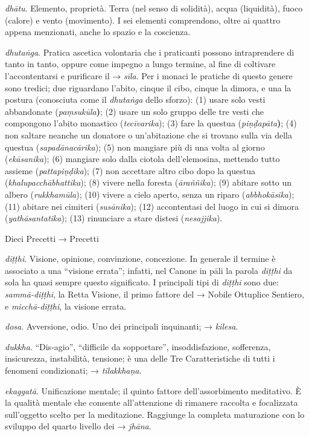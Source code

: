 \emph{dhātu}. Elemento, proprietà. Terra (nel senso di solidità), acqua
(liquidità), fuoco (calore) e vento (movimento). I sei elementi
comprendono, oltre ai quattro appena menzionati, anche lo spazio e la
coscienza.

\emph{dhutaṅga}. Pratica ascetica volontaria che i praticanti possono
intraprendere di tanto in tanto, oppure come impegno a lungo termine, al
fine di coltivare l'accontentarsi e purificare il → \emph{sīla}. Per i
monaci le pratiche di questo genere sono tredici; due riguardano
l'abito, cinque il cibo, cinque la dimora, e una la postura (conosciuta
come il \emph{dhutaṅga} dello sforzo): (1) usare solo vesti abbandonate
(\emph{paṃsukūla}\textbf{)}; (2) usare un solo gruppo delle tre vesti
che compongono l'abito monastico (\emph{tecīvarika}); (3) fare la
questua (\emph{piṇḍapāta}\textbf{)}; (4) non saltare neanche un donatore
o un'abitazione che si trovano sulla via della questua
(\emph{sapadānacārika}); (5) non mangiare più di una volta al giorno
(\emph{ekāsanika}); (6) mangiare solo dalla ciotola dell'elemosina,
mettendo tutto assieme (\emph{pattapiṇḍika}); (7) non accettare altro
cibo dopo la questua (\emph{khalupacchābhattika}); (8) vivere nella
foresta (\emph{āraññika}); (9) abitare sotto un albero
(\emph{rukkhamūla}); (10) vivere a cielo aperto, senza un riparo
(\emph{abbhokāsika}); (11) abitare nei cimiteri (\emph{susānika}); (12)
accontentasi del luogo in cui si dimora (\emph{yathāsantatika}); (13)
rinunciare a stare distesi (\emph{nesajjika}).

Dieci Precetti → Precetti

\emph{diṭṭhi}. Visione, opinione, convinzione, concezione. In generale
il termine è associato a una ``visione errata''; infatti, nel Canone in
pāli la parola \emph{diṭṭhi} da sola ha quasi sempre questo significato.
I principali tipi di \emph{diṭṭhi} sono due: \emph{sammā-diṭṭhi}, la
Retta Visione, il primo fattore del → Nobile Ottuplice Sentiero, e
\emph{micchā-diṭṭhi}, la visione errata.

\emph{dosa}. Avversione, odio. Uno dei principali inquinanti; →
\emph{kilesa}.

\emph{dukkha}. ``Dis-agio'', ``difficile da sopportare'',
insoddisfazione, sofferenza, insicurezza, instabilità, tensione; è una
delle Tre Caratteristiche di tutti i fenomeni condizionati; →
\emph{tilakkhaṇa}.

\emph{ekaggatā}. Unificazione mentale; il quinto fattore
dell'assorbimento meditativo. È la qualità mentale che consente
all'attenzione di rimanere raccolta e focalizzata sull'oggetto scelto
per la meditazione. Raggiunge la completa maturazione con lo sviluppo
del quarto livello dei → \emph{jhāna}.

